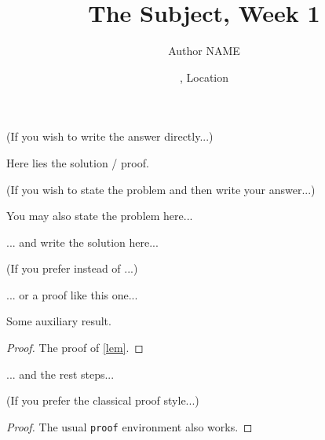 \documentclass[11pt,
  logo = {example-image},
  title in boldface,
  theorem in new line,
]{homework}
\title{The Subject, Week 1}
\author{Author NAME}
\date{\TheDate{2023-12-25}, Location}
\begin{document}
\bigskip\textcolor{gray!55}{(If you wish to write the answer directly...)}

\begin{problem}
    Here lies the solution / proof.
\end{problem}


\bigskip\textcolor{gray!55}{(If you wish to state the problem and then write your answer...)}

\begin{problem}
    You may also state the problem here...
\end{problem}

\begin{solution}
    ... and write the solution here...
\end{solution}

\bigskip\textcolor{gray!55}{(If you prefer  instead of ...)}

\begin{solution}[Proof]
    ... or a proof like this one...
    \begin{lemma}\label{lem}
        Some auxiliary result.
    \end{lemma}
    \begin{proof}
        The proof of \cref{lem}.
    \end{proof}
    ... and the rest steps...
\end{solution}


\bigskip\textcolor{gray!55}{(If you prefer the classical proof style...)}

\begin{proof}
    The usual \verb|proof| environment also works.
\end{proof}
\end{document}

